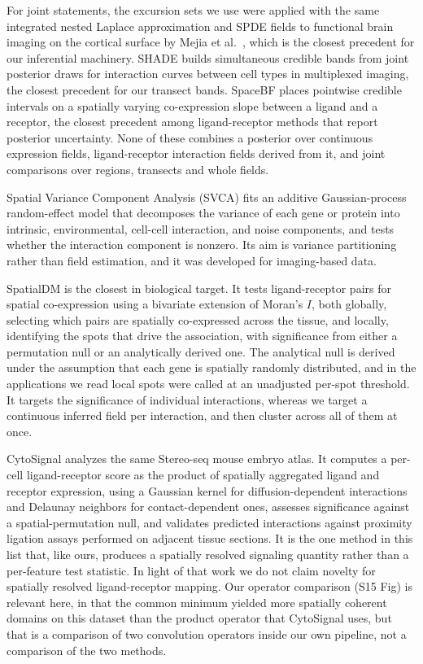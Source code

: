 \documentclass[10pt,letterpaper]{article}
\begin{document}
For joint statements, the excursion sets we use \cite{bolin2015excursion,bolin2018excursions} were applied with the same integrated nested Laplace approximation and SPDE fields to functional brain imaging on the cortical surface by Mejia et al.\ \cite{mejia2020bayesian}, which is the closest precedent for our inferential machinery. SHADE \cite{eliason2026shade} builds simultaneous credible bands from joint posterior draws for interaction curves between cell types in multiplexed imaging, the closest precedent for our transect bands. SpaceBF \cite{seal2026spacebf} places pointwise credible intervals on a spatially varying co-expression slope between a ligand and a receptor, the closest precedent among ligand-receptor methods that report posterior uncertainty. None of these combines a posterior over continuous expression fields, ligand-receptor interaction fields derived from it, and joint comparisons over regions, transects and whole fields.

Spatial Variance Component Analysis (SVCA) \cite{Arnol2019} fits an additive Gaussian-process random-effect model that decomposes the variance of each gene or protein into intrinsic, environmental, cell-cell interaction, and noise components, and tests whether the interaction component is nonzero. Its aim is variance partitioning rather than field estimation, and it was developed for imaging-based data.

SpatialDM \cite{Li2023} is the closest in biological target. It tests ligand-receptor pairs for spatial co-expression using a bivariate extension of Moran's $I$, both globally, selecting which pairs are spatially co-expressed across the tissue, and locally, identifying the spots that drive the association, with significance from either a permutation null or an analytically derived one. The analytical null is derived under the assumption that each gene is spatially randomly distributed, and in the applications we read local spots were called at an unadjusted per-spot threshold. It targets the significance of individual interactions, whereas we target a continuous inferred field per interaction, and then cluster across all of them at once.

CytoSignal \cite{Liu2026} analyzes the same Stereo-seq mouse embryo atlas. It computes a per-cell ligand-receptor score as the product of spatially aggregated ligand and receptor expression, using a Gaussian kernel for diffusion-dependent interactions and Delaunay neighbors for contact-dependent ones, assesses significance against a spatial-permutation null, and validates predicted interactions against proximity ligation assays performed on adjacent tissue sections. It is the one method in this list that, like ours, produces a spatially resolved signaling quantity rather than a per-feature test statistic. In light of that work we do not claim novelty for spatially resolved ligand-receptor mapping. Our operator comparison (S15 Fig) is relevant here, in that the common minimum yielded more spatially coherent domains on this dataset than the product operator that CytoSignal uses, but that is a comparison of two convolution operators inside our own pipeline, not a comparison of the two methods.
\end{document}
